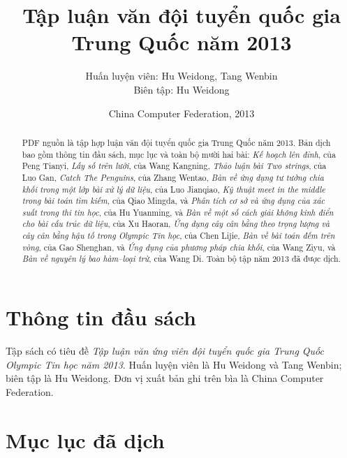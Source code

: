 \documentclass[11pt]{article}
\title{Tập luận văn đội tuyển quốc gia Trung Quốc năm 2013}
\author{Huấn luyện viên: Hu Weidong, Tang Wenbin\\Biên tập: Hu Weidong}
\date{China Computer Federation, 2013}
\begin{document}
\maketitle


\renewcommand{\abstractname}{Tóm tắt}
\begin{abstract}
PDF nguồn là tập hợp luận văn đội tuyển quốc gia Trung Quốc năm 2013. Bản
dịch bao gồm thông tin đầu sách, mục lục và toàn bộ mười hai bài:
\emph{Kế hoạch lên đỉnh}, của Peng Tianyi, \emph{Lấy số trên lưới}, của
Wang Kangning, \emph{Thảo luận bài Two strings}, của Luo Gan,
\emph{Catch The Penguins}, của Zhang Wentao, \emph{Bàn về ứng dụng tư tưởng
chia khối trong một lớp bài xử lý dữ liệu}, của Luo Jianqiao, \emph{Kỹ
thuật meet in the middle trong bài toán tìm kiếm}, của Qiao Mingda, và
\emph{Phân tích cơ sở và ứng dụng của xác suất trong thi tin học}, của Hu
Yuanming, và \emph{Bàn về một số cách giải không kinh điển cho bài cấu trúc
dữ liệu}, của Xu Haoran, \emph{Ứng dụng cây cân bằng theo trọng lượng và
cây cân bằng hậu tố trong Olympic Tin học}, của Chen Lijie, \emph{Bàn về bài
toán đếm trên vòng}, của Gao Shenghan, và \emph{Ứng dụng của phương pháp
chia khối}, của Wang Ziyu, và \emph{Bàn về nguyên lý bao hàm--loại trừ}, của
Wang Di. Toàn bộ tập năm 2013 đã được dịch.
\end{abstract}

\section{Thông tin đầu sách}

Tập sách có tiêu đề \emph{Tập luận văn ứng viên đội tuyển quốc gia Trung Quốc
Olympic Tin học năm 2013}. Huấn luyện viên là Hu Weidong và Tang Wenbin; biên
tập là Hu Weidong. Đơn vị xuất bản ghi trên bìa là China Computer Federation.

\section{Mục lục đã dịch}
\end{document}
